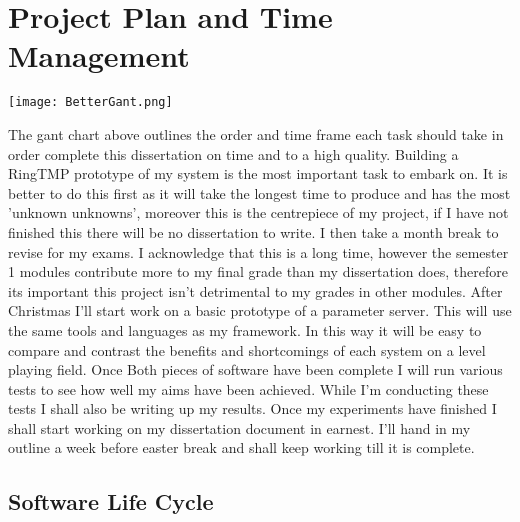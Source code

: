 \clearpage
\section{Project Plan and Time Management}

\texttt{[image: BetterGant.png]}

The gant chart above outlines the order and time frame each task should take in
order complete this dissertation on time and to a high quality. Building a
RingTMP prototype of my system is the most important task to embark on. It is
better to do this first as it will take the longest time to produce and has the
most 'unknown unknowns', moreover this is the centrepiece of my project, if I
have not finished this there will be no dissertation to write. I then take a
month break to revise for my exams. I acknowledge that this is a long time,
however the semester 1 modules contribute more to my final grade than my
dissertation does, therefore its important this project isn't detrimental to my
grades in other modules. After Christmas I'll start work on a basic prototype of
a parameter server. This will use the same tools and languages as my framework.
In this way it will be easy to compare and contrast the benefits and
shortcomings of each system on a level playing field. Once Both pieces of
software have been complete I will run various tests to see how well my aims
have been achieved. While I'm conducting these tests I shall also be writing up
my results. Once my experiments have finished I shall start working on my
dissertation document in earnest. I'll hand in my outline a week before easter
break and shall keep working till it is complete.

\subsection{Software Life Cycle}

